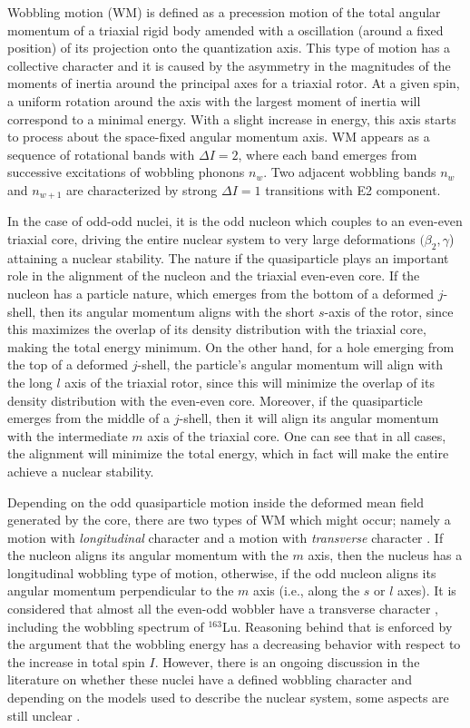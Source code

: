

Wobbling motion (WM) is defined as a precession motion of the total angular momentum of a triaxial rigid body amended with a oscillation (around a fixed position) of its projection onto the quantization axis. This type of motion has a collective character and it is caused by the asymmetry in the magnitudes of the moments of inertia around the principal axes for a triaxial rotor. At a given spin, a uniform rotation around the axis with the largest moment of inertia will correspond to a minimal energy. With a slight increase in energy, this axis starts to process about the space-fixed angular momentum axis. WM appears as a sequence of rotational bands with $\Delta I=2$, where each band emerges from successive excitations of wobbling phonons $n_w$. Two adjacent wobbling bands $n_w$ and $n_{w+1}$ are characterized by strong $\Delta I=1$ transitions with E2 component.

In the case of odd-odd nuclei, it is the odd nucleon which couples to an even-even triaxial core, driving the entire nuclear system to very large deformations $(\beta_2,\gamma$) attaining a nuclear stability. The nature if the quasiparticle plays an important role in the alignment of the nucleon and the triaxial even-even core. If the nucleon has a particle nature, which emerges from the bottom of a deformed $j$-shell, then its angular momentum aligns with the short $s$-axis of the rotor, since this maximizes the overlap of its density distribution with the triaxial core, making the total energy minimum. On the other hand, for a hole emerging from the top of a deformed $j$-shell, the particle's angular momentum will align with the long $l$ axis of the triaxial rotor, since this will minimize the overlap of its density distribution with the even-even core. Moreover, if the quasiparticle emerges from the middle of a $j$-shell, then it will align its angular momentum with the intermediate $m$ axis of the triaxial core. One can see that in all cases, the alignment will minimize the total energy, which in fact will make the entire achieve a nuclear stability.

Depending on the odd quasiparticle motion inside the deformed mean field generated by the core, there are two types of WM which might occur; namely a motion with \emph{longitudinal} character and a motion with \emph{transverse} character \cite{frauendorf2014transverse,chen2019transverse}. If the nucleon aligns its angular momentum with the $m$ axis, then the nucleus has a longitudinal wobbling type of motion, otherwise, if the odd nucleon aligns its angular momentum perpendicular to the $m$ axis (i.e., along the $s$ or $l$ axes). It is considered that almost all the even-odd wobbler have a transverse character \cite{frauendorf2014transverse}, including the wobbling spectrum of $^{163}$Lu. Reasoning behind that is enforced by the argument that the wobbling energy has a decreasing behavior with respect to the increase in total spin $I$. However, there is an ongoing discussion in the literature on whether these nuclei have a defined wobbling character and depending on the models used to describe the nuclear system, some aspects are still unclear \cite{tanabe2017stability,frauendorf2018comment,tanabe2018reply}.


